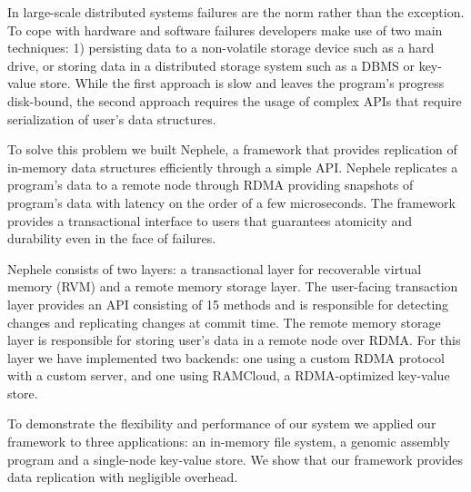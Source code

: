 In large-scale distributed systems failures are the norm rather than the exception. 
To cope with hardware and software failures developers make use of two main techniques: 1) persisting data to a non-volatile storage device such as a hard drive, or storing data in a distributed storage system such as a DBMS or key-value store. 
While the first approach is slow and leaves the program's progress disk-bound, the second approach requires the usage of complex APIs that require serialization of user's data structures.

To solve this problem we built Nephele, a framework that provides replication of in-memory data structures efficiently through a simple API. 
Nephele replicates a program's data to a remote node through RDMA providing snapshots of program's data with latency on the order of a few microseconds.
The framework provides a transactional interface to users that guarantees atomicity and durability even in the face of failures.

Nephele consists of two layers: a transactional layer for recoverable virtual memory (RVM) and a remote memory storage layer. The user-facing transaction layer provides an API consisting of 15 methods and is responsible for detecting changes and replicating changes at commit time. The remote memory storage layer is responsible for storing user's data in a remote node over RDMA. For this layer we have implemented two backends: one using a custom RDMA protocol with a custom server, and one using RAMCloud, a RDMA-optimized key-value store.

To demonstrate the flexibility and performance of our system we applied our framework to three applications: an in-memory file system, a genomic assembly program and a single-node key-value store.
We show that our framework provides data replication with negligible overhead.

